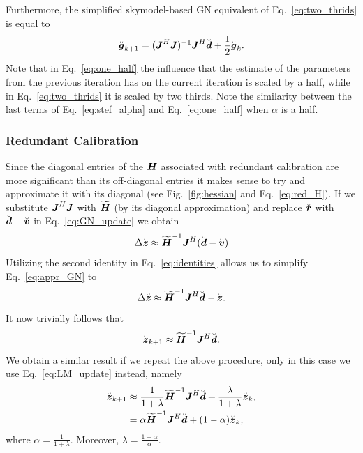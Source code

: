 \documentclass[useAMS,usenatbib]{mn2e}
\newcommand{\bz}{\bmath{z}}
\newcommand{\br}{\bmath{r}}
\newcommand{\bg}{\bmath{g}}
\newcommand{\bd}{\bmath{d}}
\newcommand{\bv}{\bmath{v}}
\newcommand{\bJ}{\bmath{J}}
\newcommand{\bH}{\bmath{H}}
\begin{document}
Furthermore, the simplified skymodel-based GN equivalent of Eq.~\eqref{eq:two_thrids} is equal to
\citep{Smirnov2015}
\begin{equation}
\label{eq:one_half}
\breve{\bg}_{k+1} = (\bJ^H\bJ)^{-1}\bJ^H\breve{\bd} + \frac{1}{2}\breve{\bg}_{k}. 
\end{equation}
Note that in Eq.~\eqref{eq:one_half} the influence that the estimate of the parameters from the previous iteration has on the current iteration is scaled by a half, while
in Eq.~\eqref{eq:two_thrids} it is scaled by two thirds. Note the similarity between the last terms of Eq.~\eqref{eq:stef_alpha} and Eq.~\eqref{eq:one_half} when $\alpha$ is a half.

\subsubsection{Redundant Calibration}
\label{sec:red_c}
Since the diagonal entries of the $\bH$ associated with redundant calibration are more significant than its off-diagonal entries it makes 
sense to try and approximate it with its diagonal (see Fig.~\ref{fig:hessian} and Eq.~\eqref{eq:red_H}).
If we substitute $\bJ^H\bJ$ with $\widetilde{\bH}$ (by its diagonal approximation) and replace $\breve{\br}$ with $\breve{\bd} - \breve{\bv}$ in Eq.~\eqref{eq:GN_update} we obtain
\begin{equation}
\label{eq:appr_GN}
 \Delta \breve{\bz} \approx \widetilde{\bH}^{-1}\bJ^H(\breve{\bd}-\breve{\bv})
\end{equation}
Utilizing the second identity in Eq.~\eqref{eq:identities} allows us to simplify Eq.~\eqref{eq:appr_GN} to
\begin{equation}
  \Delta \breve{\bz} \approx \widetilde{\bH}^{-1}\bJ^H\breve{\bd}-\breve{\bz}.
\end{equation}
It now trivially follows that
\begin{equation}
 \breve{\bz}_{k+1} \approx \widetilde{\bH}^{-1}\bJ^H\breve{\bd}.
\end{equation}
We obtain a similar result if we repeat the above procedure, only in this case we use Eq.~\eqref{eq:LM_update} instead,
namely
\begin{align}
\breve{\bz}_{k+1} &\approx \frac{1}{1+\lambda}\widetilde{\bH}^{-1}\bJ^H\breve{\bd} + \frac{\lambda}{1+\lambda} \breve{\bz}_k,\label{eq:lambda}\\
 &= \alpha \widetilde{\bH}^{-1}\bJ^H\breve{\bd} + (1-\alpha)\breve{\bz}_k, \label{eq:alpha}  
\end{align}
where $\alpha = \frac{1}{1+\lambda}$. Moreover, $\lambda = \frac{1-\alpha}{\alpha}$.
\end{document}
